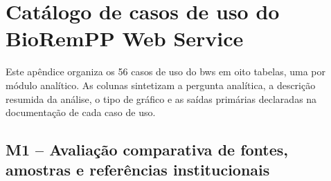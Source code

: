 \chapter{Catálogo de casos de uso do BioRemPP Web Service}
\label{ap:c3-casos-de-uso}

Este apêndice organiza os 56 casos de uso do \gls{bws} em oito tabelas, uma
por módulo analítico. As colunas sintetizam a pergunta analítica, a descrição
resumida da análise, o tipo de gráfico e as saídas primárias declaradas na
documentação de cada caso de uso.

\newcommand{\bwsusecaseheader}{\toprule \textbf{UC} &
\textbf{Pergunta analítica} & \textbf{Descrição resumida} &
\textbf{Visualization} & \textbf{Saídas primárias} \\ \midrule}

\section{M1 -- Avaliação comparativa de fontes, amostras e referências institucionais}
